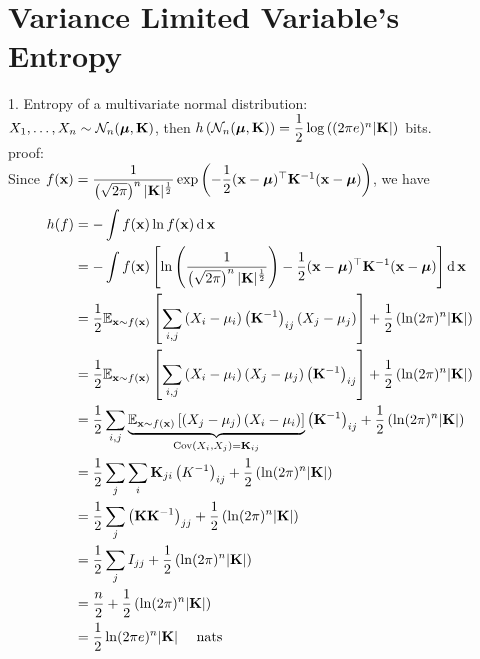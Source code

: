 \section{Variance Limited Variable's Entropy}

1. Entropy of a multivariate normal distribution: \\
$X_1,\ldots,X_n \sim \mathcal{N}_n(\bm{\mu},\mathbf{K})$, then $h\left(\mathcal{N}_n(\bm{\mu},\mathbf{K})\right)=\dfrac{1}{2}\log\left((2\pi e)^n|\mathbf{K}|\right)$ bits. \\
proof: \\
Since $f(\mathbf{x})=\dfrac{1}{\left(\sqrt{2\pi}\right)^n|\mathbf{K}|^{\frac{1}{2}}}\exp\left(-\dfrac{1}{2}(\mathbf{x}-\bm{\mu})^{\top}\mathbf{K}^{-1}(\mathbf{x}-\bm{\mu})\right)$, we have
\begin{align*}
h(f) &= -\int f(\mathbf{x})\ln f(\mathbf{x})\operatorname{d}\mathbf{x} \\
&= -\int f(\mathbf{x})\left[\ln\left(\dfrac{1}{\left(\sqrt{2\pi}\right)^n|\mathbf{K}|^{\frac{1}{2}}}\right)-\dfrac{1}{2}(\mathbf{x}-\bm{\mu})^{\top}\mathbf{K}^{-1}(\mathbf{x}-\bm{\mu})\right]\operatorname{d}\mathbf{x} \\
&= \dfrac{1}{2} \mathbb{E}_{\mathbf{x}\sim f(\mathbf{x})} \left[\sum_{i, j}\left(X_i-\mu_i\right)\left(\mathbf{K}^{-1}\right)_{i j}\left(X_j-\mu_j\right)\right]+ \dfrac{1}{2}\left( \ln (2 \pi)^n|\mathbf{K}|\right) \\
&= \dfrac{1}{2} \mathbb{E}_{\mathbf{x}\sim f(\mathbf{x})} \left[\sum_{i, j}\left(X_i-\mu_i\right)\left(X_j-\mu_j\right)\left(\mathbf{K}^{-1}\right)_{i j}\right]+ \dfrac{1}{2}\left( \ln (2 \pi)^n|\mathbf{K}|\right) \\
&= \dfrac{1}{2} \sum_{i, j} \underbrace{\mathbb{E}_{\mathbf{x}\sim f(\mathbf{x})} \left[\left(X_j-\mu_j\right)\left(X_i-\mu_i\right)\right]}_{\operatorname{Cov}(X_i,X_j)=\mathbf{K}_{ij}} \left(\mathbf{K}^{-1}\right)_{i j}+ \dfrac{1}{2}\left( \ln (2 \pi)^n|\mathbf{K}|\right) \\
&= \dfrac{1}{2} \sum_j \sum_i \mathbf{K}_{j i}\left(K^{-1}\right)_{i j}+ \dfrac{1}{2}\left( \ln (2 \pi)^n|\mathbf{K}|\right) \\
&= \dfrac{1}{2} \sum_j\left(\mathbf{K} \mathbf{K}^{-1}\right)_{j j}+ \dfrac{1}{2}\left( \ln (2 \pi)^n|\mathbf{K}|\right) \\
&= \dfrac{1}{2} \sum_j I_{j j}+ \dfrac{1}{2}\left( \ln (2 \pi)^n|\mathbf{K}|\right) \\
&= \dfrac{n}{2}+ \dfrac{1}{2}\left( \ln (2 \pi)^n|\mathbf{K}|\right) \\
&= \dfrac{1}{2} \ln (2 \pi e)^n|\mathbf{K}| \quad \text { nats }
\end{align*}

